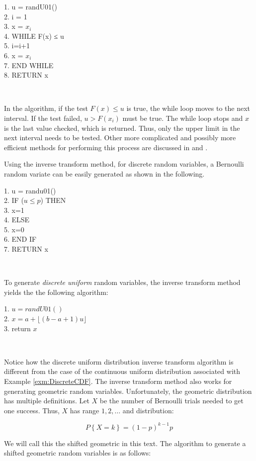 \documentclass[
]{book}
\theoremstyle{definition}
\theoremstyle{definition}
\theoremstyle{definition}
\theoremstyle{definition}
\theoremstyle{remark}
\begin{document}
1. u = randU01()\\
2. i = 1\\
3. x = \(x_i\)\\
4. WHILE F(x) ≤ u\\
5. i=i+1\\
6. x = \(x_i\)\\
7. END WHILE\\
8. RETURN x

~

In the algorithm, if the test \(F(x) \leq u\) is true, the while loop
moves to the next interval. If the test failed, \(u > F(x_{i})\) must be
true. The while loop stops and \(x\) is the last value checked, which is
returned. Thus, only the upper limit in the next interval needs to be
tested. Other more complicated and possibly more efficient methods for
performing this process are discussed in \citep{fishman2006first} and
\citep{ripley1987stochastic}.

Using the inverse transform method, for discrete random variables, a
Bernoulli random variate can be easily generated as shown in the following.

1. u = randu01()\\
2. IF (\(u \leq p\)) THEN\\
3. x=1\\
4. ELSE\\
5. x=0\\
6. END IF\\
7. RETURN x

~

To generate \emph{discrete uniform} random variables, the inverse transform
method yields the the following algorithm:

1. \(u = randU01()\)\\
2. \(x = a + \lfloor(b-a+1)u\rfloor\)\\
3. return \(x\)

~

Notice how the discrete uniform distribution inverse transform algorithm is different from the case of the continuous uniform distribution associated with Example \ref{exm:DiscreteCDF}. The inverse transform method also works for generating geometric random variables. Unfortunately, the geometric distribution has multiple
definitions. Let \(X\) be the number of Bernoulli trials needed to get one
success. Thus, \(X\) has range \(1, 2, \ldots\) and distribution:

\[
P \left\{X=k\right\} = (1-p)^{k-1}p
\]

We will call this the shifted geometric in this text. The algorithm to
generate a shifted geometric random variables is as follows:
\end{document}
